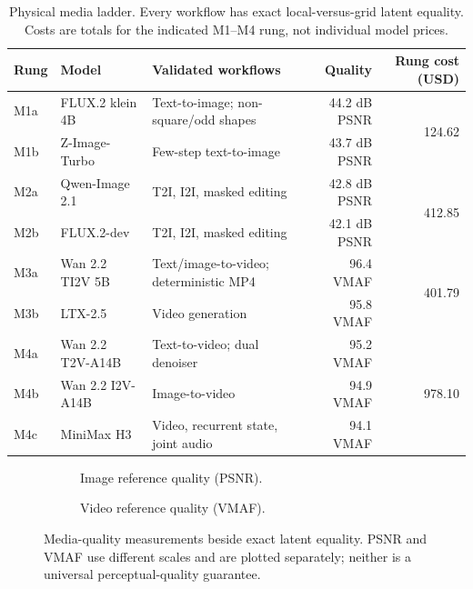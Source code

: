 \begin{table}[htbp]
\centering\small
\caption{Physical media ladder. Every workflow has exact local-versus-grid latent equality. Costs are totals for the indicated M1--M4 rung, not individual model prices.}
\label{tab:media-ladder}
\begin{tabularx}{\linewidth}{ll>{\raggedright\arraybackslash}Xrr}
\toprule
\textbf{Rung} & \textbf{Model} & \textbf{Validated workflows} & \textbf{Quality} & \textbf{Rung cost (USD)} \\
\midrule
M1a & FLUX.2 klein 4B & Text-to-image; non-square/odd shapes & 44.2 dB PSNR & \multirow{2}{*}{124.62} \\
M1b & Z-Image-Turbo & Few-step text-to-image & 43.7 dB PSNR & \\
\midrule
M2a & Qwen-Image 2.1 & T2I, I2I, masked editing & 42.8 dB PSNR & \multirow{2}{*}{412.85} \\
M2b & FLUX.2-dev & T2I, I2I, masked editing & 42.1 dB PSNR & \\
\midrule
M3a & Wan 2.2 TI2V 5B & Text/image-to-video; deterministic MP4 & 96.4 VMAF & \multirow{2}{*}{401.79} \\
M3b & LTX-2.5 & Video generation & 95.8 VMAF & \\
\midrule
M4a & Wan 2.2 T2V-A14B & Text-to-video; dual denoiser & 95.2 VMAF & \multirow{3}{*}{978.10} \\
M4b & Wan 2.2 I2V-A14B & Image-to-video & 94.9 VMAF & \\
M4c & MiniMax H3 & Video, recurrent state, joint audio & 94.1 VMAF & \\
\bottomrule
\end{tabularx}
\end{table}

\begin{figure}[htbp]
\centering
\begin{subfigure}{0.49\linewidth}
\centering
\caption{Image reference quality (PSNR).}
\end{subfigure}\hfill
\begin{subfigure}{0.49\linewidth}
\centering
\caption{Video reference quality (VMAF).}
\end{subfigure}
\caption{Media-quality measurements beside exact latent equality. PSNR and VMAF use different scales and are plotted separately; neither is a universal perceptual-quality guarantee.}
\label{fig:media-quality}
\end{figure}

